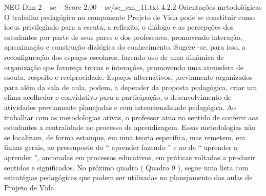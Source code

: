 \begin{textsample}{NEG Dim 2 – sc – Score 2.00 – sc/sc\_em\_11.txt}  \label{ex:f2_neg_277}
4.2.2 Orientações metodológicas O trabalho pedagógico no componente Projeto de Vida pode se constituir como locus privilegiado para a escuta, a reflexão, o diálogo e as percepções dos estudantes por parte de seus pares e dos professores, promovendo interação, aproximação e construção dialógica do conhecimento.
Sugere -se, para isso, a reconfiguração dos espaços escolares, fazendo uso de uma dinâmica de organização que favoreça trocas e interações, promovendo uma atmosfera de escuta, respeito e reciprocidade.
Espaços alternativos, previamente organizados para além da sala de aula, podem, a depender da proposta pedagógica, criar um clima acolhedor e convidativo para a participação, o desenvolvimento de atividades previamente planejadas e com intencionalidade pedagógica.
Ao trabalhar com as metodologias ativas, o professor atua no sentido de conferir aos estudantes a centralidade no processo de aprendizagem.
Essas metodologias não se localizam, de forma estanque, em uma teoria específica, mas remetem, em linhas gerais, ao pressuposto do “ aprender fazendo ” e ao de “ aprender a aprender ”, ancoradas em processos educativos, em práticas voltadas a produzir sentidos e significados.
No próximo quadro ( Quadro 9 ), segue uma lista com estratégias pedagógicas que podem ser utilizadas no planejamento das aulas de Projeto de Vida.

\end{textsample}
